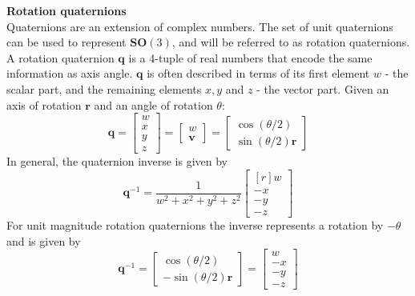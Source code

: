 		\textbf{Rotation quaternions}\\
		Quaternions are an extension of complex numbers. The set of unit quaternions can be used to represent $\mathbf{SO}(3)$, and will be referred to as rotation quaternions. 
		A rotation quaternion $\mathbf{q}$ is a 4-tuple of real numbers that encode the same information as axis angle. $\mathbf{q}$ is often described in terms of its first element $w$ - the scalar part, and the remaining elements $x,y$ and $z$ - the vector part. Given an axis of rotation $\mathbf{r}$ and an angle of rotation $\theta$:
		\begin{equation}
			\mathbf{q} = 
			\begin{bmatrix}
				w \\
				x \\
				y \\
				z
			\end{bmatrix}
			 = 
			 \begin{bmatrix}
 				w \\
 				\mathbf{v}
			 \end{bmatrix}
			 =
			 \begin{bmatrix}
			 	\cos(\theta/2) \\
			 	\sin(\theta/2)\mathbf{r}
			 \end{bmatrix}
		\end{equation}
		In general, the quaternion inverse is given by
		\begin{equation}
			\mathbf{q}^{-1} = 
			\frac{1}{w^2 + x^2 + y^2 + z^2}
		 	\begin{bmatrix*}[r]
				 w \\
				-x \\
				-y \\
				-z
			\end{bmatrix*}
		\end{equation}
		For unit magnitude rotation quaternions the inverse represents a rotation by $-\theta$ and is given by
		\begin{equation}
			\mathbf{q}^{-1} = 
			\begin{bmatrix}
			 	\cos(\theta/2) \\
			 	-\sin(\theta/2)\mathbf{r}
		 	\end{bmatrix} =
		 	\begin{bmatrix}
				w \\
				-x \\
				-y \\
				-z
			\end{bmatrix}
		\end{equation}
		
